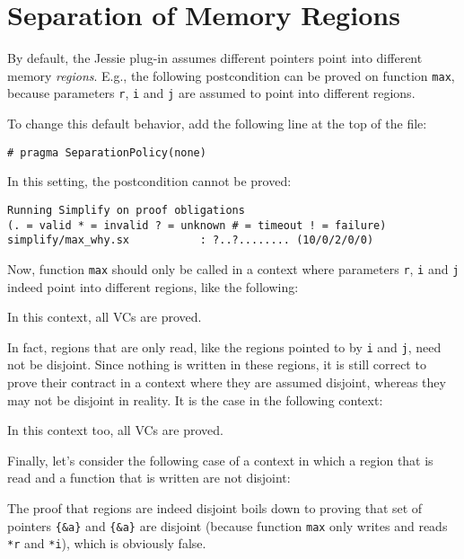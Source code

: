 \documentclass[a4paper,11pt,twoside,openright]{report}
\begin{document}
\chapter{Separation of Memory Regions}

By default, the Jessie plug-in assumes different pointers point into
different memory \textit{regions}.  E.g., the following postcondition
can be proved on function \verb|max|, because parameters \verb|r|,
\verb|i| and \verb|j| are assumed to point into different regions.



To change this default behavior, add the following line at the top of the file:
\begin{verbatim}
# pragma SeparationPolicy(none)
\end{verbatim}

In this setting, the postcondition cannot be proved:

\begin{verbatim}
Running Simplify on proof obligations
(. = valid * = invalid ? = unknown # = timeout ! = failure)
simplify/max_why.sx           : ?..?........ (10/0/2/0/0)
\end{verbatim}

Now, function \verb|max| should only be called in a context where
parameters \verb|r|, \verb|i| and \verb|j| indeed point into
different regions, like the following:



In this context, all VCs are proved.

In fact, regions that are only read, like the regions pointed to by
\verb|i| and \verb|j|, need not be disjoint. Since nothing is written
in these regions, it is still correct to prove their contract in a
context where they are assumed disjoint, whereas they may not be
disjoint in reality. It is the case in the following context:



In this context too, all VCs are proved.

Finally, let's consider the following case of a context in which a
region that is read and a function that is written are not disjoint:



The proof that regions are indeed disjoint boils down to proving that
set of pointers \verb|{&a}| and \verb|{&a}| are disjoint (because
function \verb|max| only writes and reads \verb|*r| and \verb|*i|),
which is obviously false.
\end{document}
